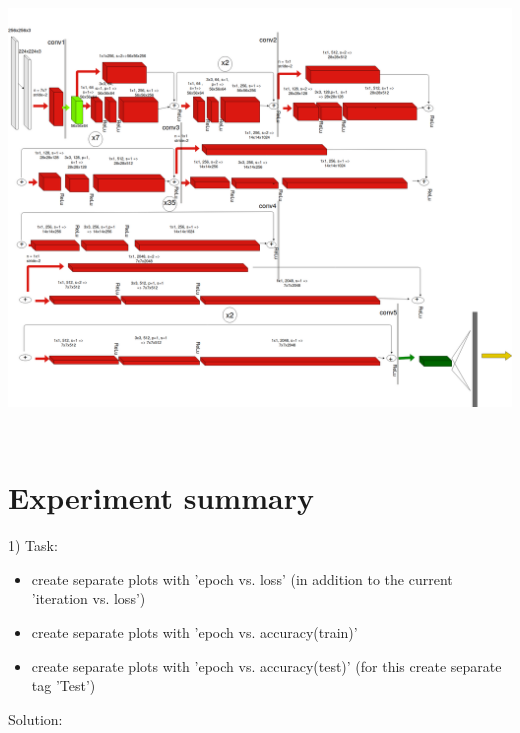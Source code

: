 \documentclass[11pt]{article}
\begin{document}
\includegraphics[width=\textwidth, height=12cm]{resnet}	

\section{Experiment summary}

1) 
	Task:
	\begin{itemize}
    \item create separate plots with 'epoch vs. loss' (in addition to the current 'iteration vs. loss')
    \item create separate plots with 'epoch vs. accuracy(train)'
    \item create separate plots with 'epoch vs. accuracy(test)' (for this create separate tag 'Test')
     \end{itemize}
     Solution:
     
\end{document}
